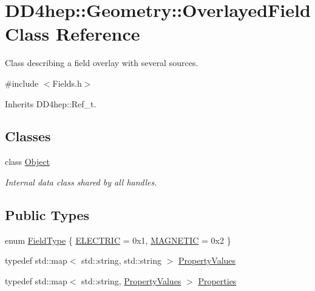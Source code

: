 \hypertarget{class_d_d4hep_1_1_geometry_1_1_overlayed_field}{
\section{DD4hep::Geometry::OverlayedField Class Reference}
\label{class_d_d4hep_1_1_geometry_1_1_overlayed_field}
}


Class describing a field overlay with several sources.  


{\ttfamily \#include $<$Fields.h$>$}

Inherits DD4hep::Ref\_\-t.\subsection*{Classes}
\begin{DoxyCompactItemize}
\item 
class \hyperlink{class_d_d4hep_1_1_geometry_1_1_overlayed_field_1_1_object}{Object}
\begin{DoxyCompactList}\small\item\em Internal data class shared by all handles. \item\end{DoxyCompactList}\end{DoxyCompactItemize}
\subsection*{Public Types}
\begin{DoxyCompactItemize}
\item 
enum \hyperlink{class_d_d4hep_1_1_geometry_1_1_overlayed_field_a2f60d9b8d93ccdb0844510b1d3f61b9f}{FieldType} \{ \hyperlink{class_d_d4hep_1_1_geometry_1_1_overlayed_field_a2f60d9b8d93ccdb0844510b1d3f61b9fa0f91cdc2eef79d1d0f79b51dee49eab1}{ELECTRIC} =  0x1, 
\hyperlink{class_d_d4hep_1_1_geometry_1_1_overlayed_field_a2f60d9b8d93ccdb0844510b1d3f61b9fa471f7e06140ef02e7c63027095ba413a}{MAGNETIC} =  0x2
 \}
\item 
typedef std::map$<$ std::string, std::string $>$ \hyperlink{class_d_d4hep_1_1_geometry_1_1_overlayed_field_ade93bff8af042a76d9d25e1f7072b532}{PropertyValues}
\item 
typedef std::map$<$ std::string, \hyperlink{class_d_d4hep_1_1_geometry_1_1_overlayed_field_ade93bff8af042a76d9d25e1f7072b532}{PropertyValues} $>$ \hyperlink{class_d_d4hep_1_1_geometry_1_1_overlayed_field_acdf81fbf8e0c336cb724ee2846a2c5b0}{Properties}
\end{DoxyCompactItemize}

